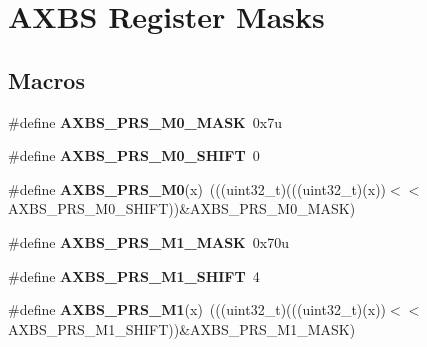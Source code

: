 \hypertarget{group__AXBS__Register__Masks}{}\section{A\+X\+BS Register Masks}
\label{group__AXBS__Register__Masks}
\subsection*{Macros}
\begin{DoxyCompactItemize}
\item 
\#define {\bfseries A\+X\+B\+S\+\_\+\+P\+R\+S\+\_\+\+M0\+\_\+\+M\+A\+SK}~0x7u\hypertarget{group__AXBS__Register__Masks_ga9e794f0ace10f0e077a92ce9f5abbb41}{}\label{group__AXBS__Register__Masks_ga9e794f0ace10f0e077a92ce9f5abbb41}

\item 
\#define {\bfseries A\+X\+B\+S\+\_\+\+P\+R\+S\+\_\+\+M0\+\_\+\+S\+H\+I\+FT}~0\hypertarget{group__AXBS__Register__Masks_ga86a8f40f6a5d45cd4868dce4833a17d5}{}\label{group__AXBS__Register__Masks_ga86a8f40f6a5d45cd4868dce4833a17d5}

\item 
\#define {\bfseries A\+X\+B\+S\+\_\+\+P\+R\+S\+\_\+\+M0}(x)~(((uint32\+\_\+t)(((uint32\+\_\+t)(x))$<$$<$A\+X\+B\+S\+\_\+\+P\+R\+S\+\_\+\+M0\+\_\+\+S\+H\+I\+FT))\&A\+X\+B\+S\+\_\+\+P\+R\+S\+\_\+\+M0\+\_\+\+M\+A\+SK)\hypertarget{group__AXBS__Register__Masks_ga86a3b0cbbb03cc09f4b0b1e367219509}{}\label{group__AXBS__Register__Masks_ga86a3b0cbbb03cc09f4b0b1e367219509}

\item 
\#define {\bfseries A\+X\+B\+S\+\_\+\+P\+R\+S\+\_\+\+M1\+\_\+\+M\+A\+SK}~0x70u\hypertarget{group__AXBS__Register__Masks_ga69131fbb37b2a3eef0e0f135e265e1c0}{}\label{group__AXBS__Register__Masks_ga69131fbb37b2a3eef0e0f135e265e1c0}

\item 
\#define {\bfseries A\+X\+B\+S\+\_\+\+P\+R\+S\+\_\+\+M1\+\_\+\+S\+H\+I\+FT}~4\hypertarget{group__AXBS__Register__Masks_gab293a628aa64a93c04ba49fd27326592}{}\label{group__AXBS__Register__Masks_gab293a628aa64a93c04ba49fd27326592}

\item 
\#define {\bfseries A\+X\+B\+S\+\_\+\+P\+R\+S\+\_\+\+M1}(x)~(((uint32\+\_\+t)(((uint32\+\_\+t)(x))$<$$<$A\+X\+B\+S\+\_\+\+P\+R\+S\+\_\+\+M1\+\_\+\+S\+H\+I\+FT))\&A\+X\+B\+S\+\_\+\+P\+R\+S\+\_\+\+M1\+\_\+\+M\+A\+SK)\hypertarget{group__AXBS__Register__Masks_gac31344f54ce2464ad6f8fef404561b80}{}\label{group__AXBS__Register__Masks_gac31344f54ce2464ad6f8fef404561b80}


\end{DoxyCompactItemize}
